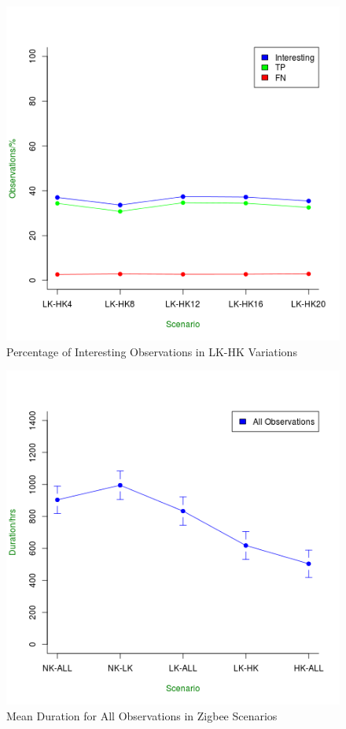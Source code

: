 \begin{figure}[!h]
\centering
\includegraphics[width=\textwidth]{Chap7/figures/khas_int_percent.png}
\caption{Percentage of Interesting Observations in LK-HK Variations}
\label{fig:khas_int_percent}
\end{figure}

\begin{figure}[!h]
\centering
\includegraphics[width=\textwidth]{Chap7/figures/all_total.png}
\caption{Mean Duration for All Observations in Zigbee Scenarios}
\label{fig:all_total}
\end{figure}


